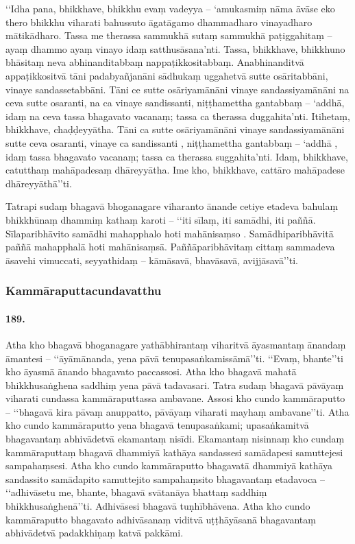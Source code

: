 ‘‘Idha pana, bhikkhave, bhikkhu evaṃ vadeyya – ‘amukasmiṃ nāma āvāse eko thero bhikkhu viharati bahussuto āgatāgamo dhammadharo vinayadharo mātikādharo. Tassa me therassa sammukhā sutaṃ sammukhā paṭiggahitaṃ – ayaṃ dhammo ayaṃ vinayo idaṃ satthusāsana’nti. Tassa, bhikkhave, bhikkhuno bhāsitaṃ neva abhinanditabbaṃ nappaṭikkositabbaṃ. Anabhinanditvā appaṭikkositvā tāni padabyañjanāni sādhukaṃ uggahetvā sutte osāritabbāni, vinaye sandassetabbāni. Tāni ce sutte osāriyamānāni vinaye sandassiyamānāni na ceva sutte osaranti, na ca vinaye sandissanti, niṭṭhamettha gantabbaṃ – ‘addhā, idaṃ na ceva tassa bhagavato vacanaṃ; tassa ca therassa duggahita’nti. Itihetaṃ, bhikkhave, chaḍḍeyyātha. Tāni ca sutte osāriyamānāni vinaye sandassiyamānāni sutte ceva osaranti, vinaye ca sandissanti , niṭṭhamettha gantabbaṃ – ‘addhā , idaṃ tassa bhagavato vacanaṃ; tassa ca therassa suggahita’nti. Idaṃ, bhikkhave, catutthaṃ mahāpadesaṃ dhāreyyātha. Ime kho, bhikkhave, cattāro mahāpadese dhāreyyāthā’’ti.

Tatrapi sudaṃ bhagavā bhoganagare viharanto ānande cetiye etadeva bahulaṃ bhikkhūnaṃ dhammiṃ kathaṃ karoti – ‘‘iti sīlaṃ, iti samādhi, iti paññā. Sīlaparibhāvito samādhi mahapphalo hoti mahānisaṃso . Samādhiparibhāvitā paññā mahapphalā hoti mahānisaṃsā. Paññāparibhāvitaṃ cittaṃ sammadeva āsavehi vimuccati, seyyathidaṃ – kāmāsavā, bhavāsavā, avijjāsavā’’ti.

\subsubsection{Kammāraputtacundavatthu}

\paragraph{189.} Atha kho bhagavā bhoganagare yathābhirantaṃ viharitvā āyasmantaṃ ānandaṃ āmantesi – ‘‘āyāmānanda, yena pāvā tenupasaṅkamissāmā’’ti. ‘‘Evaṃ, bhante’’ti kho āyasmā ānando bhagavato paccassosi. Atha kho bhagavā mahatā bhikkhusaṅghena saddhiṃ yena pāvā tadavasari. Tatra sudaṃ bhagavā pāvāyaṃ viharati cundassa kammāraputtassa ambavane. Assosi kho cundo kammāraputto – ‘‘bhagavā kira pāvaṃ anuppatto, pāvāyaṃ viharati mayhaṃ ambavane’’ti. Atha kho cundo kammāraputto yena bhagavā tenupasaṅkami; upasaṅkamitvā bhagavantaṃ abhivādetvā ekamantaṃ nisīdi. Ekamantaṃ nisinnaṃ kho cundaṃ kammāraputtaṃ bhagavā dhammiyā kathāya sandassesi samādapesi samuttejesi sampahaṃsesi. Atha kho cundo kammāraputto bhagavatā dhammiyā kathāya sandassito samādapito samuttejito sampahaṃsito bhagavantaṃ etadavoca – ‘‘adhivāsetu me, bhante, bhagavā svātanāya bhattaṃ saddhiṃ bhikkhusaṅghenā’’ti. Adhivāsesi bhagavā tuṇhībhāvena. Atha kho cundo kammāraputto bhagavato adhivāsanaṃ viditvā uṭṭhāyāsanā bhagavantaṃ abhivādetvā padakkhiṇaṃ katvā pakkāmi.

